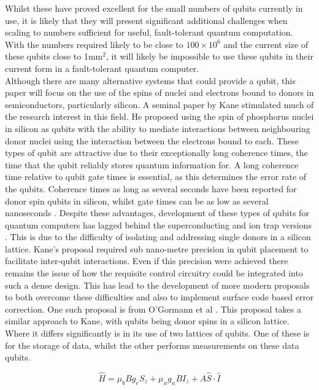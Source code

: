Whilst these have proved excellent for the small numbers of qubits currently in use, it is likely that they will present significant additional challenges when scaling to numbers sufficient for useful, fault-tolerant quantum computation.
With the numbers required likely to be close to $100 \times 10^6$ and the current size of these qubits close to 1mm$^2$, it will likely be impossible to use these qubits in their current form in a fault-tolerant quantum computer.
\\
Although there are many alternative systems that could provide a qubit, this paper will focus on the use of the spins of nuclei and electrons bound to donors in semiconductors, particularly silicon.
A seminal paper by Kane \cite{Kane1998} stimulated much of the research interest in this field.
He proposed using the spin of phosphorus nuclei in silicon as qubits with the ability to mediate interactions between neighbouring donor nuclei using the interaction between the electrons bound to each.
These types of qubit are attractive due to their exceptionally long coherence times, the time that the qubit reliably stores quantum information for. 
A long coherence time relative to qubit gate times is essential, as this determines the error rate of the qubits.
Coherence times as long as several seconds have been reported for donor spin qubits in silicon, whilst gate times can be as low as several nanoseconds \cite{Wolfowicz2013}. 
Despite these advantages, development of these types of qubits for quantum computers has lagged behind the superconducting and ion trap versions \cite{Ballance2015}. 
This is due to the difficulty of isolating and addressing single donors in a silicon lattice. 
Kane's proposal required sub nano-metre precision in qubit placement to facilitate inter-qubit interactions. 
Even if this precision were achieved there remains the issue of how the requisite control circuitry could be integrated into such a dense design.
This has lead to the development of more modern proposals to both overcome these difficulties and also to implement surface code based error correction.
One such proposal is from O'Gormann et al \cite{OGorman2014}. 
This proposal takes a similar approach to Kane, with qubits being donor spins in a silicon lattice. 
Where it differs significantly is in its use of two lattices of qubits. 
One of these is for the storage of data, whilst the other performs measurements on these data qubits. 


\begin{equation}
\hat{H} = \mu_bBg_eS_z + \mu_ng_nBI_z + A \hat{S}\cdot\hat{I}
\end{equation}


